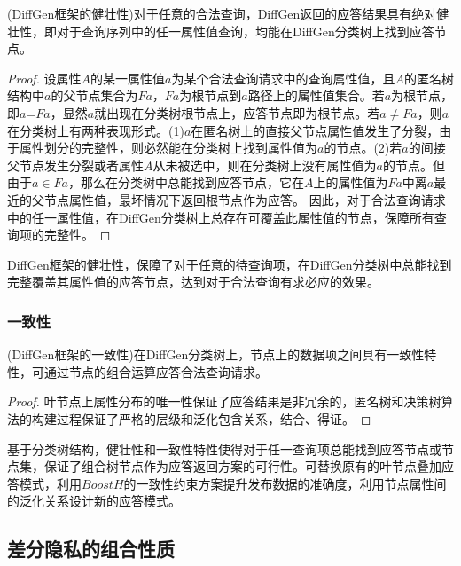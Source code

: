 \begin{prop}
	\label{chap4_prop3}
	(DiffGen框架的健壮性)对于任意的合法查询，DiffGen返回的应答结果具有绝对健壮性，即对于查询序列中的任一属性值查询，均能在DiffGen分类树上找到应答节点。
\end{prop}
\begin{proof}
	设属性$A$的某一属性值$a$为某个合法查询请求中的查询属性值，且$A$的匿名树结构中$a$的父节点集合为$Fa$，$Fa$为根节点到$a$路径上的属性值集合。若$a$为根节点，即$a$=$Fa$，显然$a$就出现在分类树根节点上，应答节点即为根节点。若$a$$\neq$$Fa$，则$a$在分类树上有两种表现形式。(1)$a$在匿名树上的直接父节点属性值发生了分裂，由于\label{chap4_prop2}属性划分的完整性，则必然能在分类树上找到属性值为$a$的节点。(2)若$a$的间接父节点发生分裂或者属性$A$从未被选中，则在分类树上没有属性值为$a$的节点。但由于$a$$\in$$Fa$，那么在分类树中总能找到应答节点，它在$A$上的属性值为$Fa$中离$a$最近的父节点属性值，最坏情况下返回根节点作为应答。
	因此，对于合法查询请求中的任一属性值，在DiffGen分类树上总存在可覆盖此属性值的节点，保障所有查询项的完整性。
\end{proof}

DiffGen框架的健壮性，保障了对于任意的待查询项，在DiffGen分类树中总能找到完整覆盖其属性值的应答节点，达到对于合法查询有求必应的效果。

\subsubsection{一致性}

\begin{prop}
	\label{chap4_prop4}
	(DiffGen框架的一致性)在DiffGen分类树上，节点上的数据项之间具有一致性特性，可通过节点的组合运算应答合法查询请求。
\end{prop}
\begin{proof}
	叶节点上属性分布的唯一性保证了应答结果是非冗余的，匿名树和决策树算法的构建过程保证了严格的层级和泛化包含关系，结合\label{chap4_prop2}、\label{chap4_prop3}得证。
\end{proof}

基于分类树结构，健壮性和一致性特性使得对于任一查询项总能找到应答节点或节点集，保证了组合树节点作为应答返回方案的可行性。可替换原有的叶节点叠加应答模式，利用$BoostH$的一致性约束方案提升发布数据的准确度，利用节点属性间的泛化关系设计新的应答模式。

\subsection{差分隐私的组合性质}

